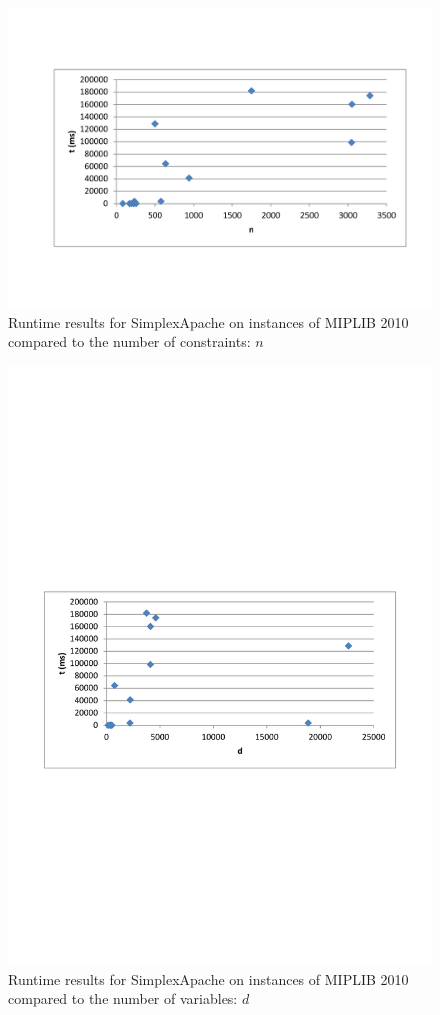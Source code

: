 \documentclass[nocopyrightspace]{acm_proc_article-sp}
\begin{document}
\begin{figure}[h!]
\includegraphics[width=\columnwidth]{../Results/miplib_apache_n.pdf}
\caption{Runtime results for SimplexApache on instances of MIPLIB 2010 \cite{KochEtAl2011} compared to the number of constraints: $n$}
\label{fig:miplibresults_n}
\end{figure}
\begin{figure}[h!]
\includegraphics[width=\columnwidth]{../Results/miplib_apache_d.pdf}
\caption{Runtime results for SimplexApache on instances of MIPLIB 2010 \cite{KochEtAl2011} compared to the number of variables: $d$}
\label{fig:miplibresults_d}
\end{figure}
\end{document}
